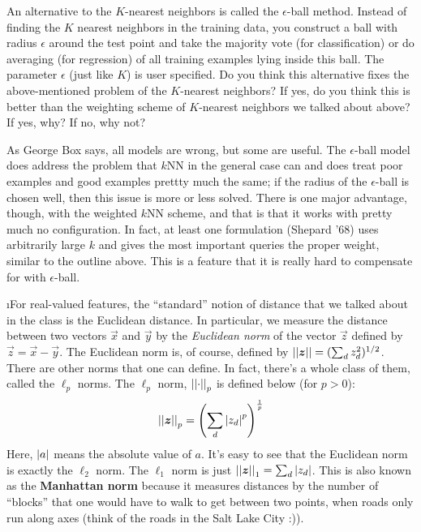 \documentclass[fleqn]{article}
\begin{document}
An alternative to the $K$-nearest neighbors is called the $\epsilon$-ball
method. Instead of finding the $K$ nearest neighbors in the training 
data, you construct a ball with radius $\epsilon$ around the test point
and take the majority vote (for classification) or do averaging (for regression)
of all training examples lying inside this ball. The parameter $\epsilon$ (just 
like $K$) is user specified. Do you think this alternative fixes the 
above-mentioned problem of the $K$-nearest neighbors? If yes, do you think this 
is better than the weighting scheme of $K$-nearest neighbors we talked about 
above? If yes, why? If no, why not?

\begin{solution}
As George Box says, all models are wrong, but some are useful. The $\epsilon$-ball model does address the problem that $k$NN in the general case can and does treat poor examples and good examples prettty much the same; if the radius of the $\epsilon$-ball is chosen well, then this issue is more or less solved. There is one major advantage, though, with the weighted $k$NN scheme, and that is that it works with pretty much no configuration. In fact, at least one formulation (Shepard '68) uses arbitrarily large $k$ and gives the most important queries the proper weight, similar to the outline above. This is a feature that it is really hard to compensate for with $\epsilon$-ball.
\end{solution}


\i For real-valued features, the ``standard'' notion of distance 
that we talked about in the class is the Euclidean distance. 
In particular, we measure the distance between two vectors $\vec x$ 
and $\vec y$ by the \emph{Euclidean norm} of the vector $\vec z$ 
defined by $\vec z = \vec x - \vec y$.  The Euclidean norm is, of 
course, defined by $\left\vert\left\vert \boldsymbol{z} \right\vert\right\vert = (\sum_d z_d^2)^{1/2}$.  There 
are other norms that one can define.  In fact,
there's a whole class of them, called the $\ell_p$ norms.  The
$\ell_p$ norm, $\left\vert\left\vert \cdot \right\vert\right\vert_p$ is defined below (for $p>0$):
\begin{equation*}
\left\vert\left\vert \boldsymbol{z} \right\vert\right\vert_p = \left(\sum_d \left\vert z_d \right\vert^p\right)^{\frac 1 p}
\end{equation*}
Here, $\left\vert a \right\vert$ means the absolute value of $a$.  It's easy to see that
the Euclidean norm is exactly the $\ell_2$ norm.  The $\ell_1$ norm is
just $\left\vert\left\vert \boldsymbol{z} \right\vert\right\vert_1 = \sum_d \left\vert z_d \right\vert$.  This is also known as the
\textbf{Manhattan norm} because it measures distances by the number of
``blocks'' that one would have to walk to get between two points, when
roads only run along axes (think of the roads in the Salt Lake City :)).
\end{document}
